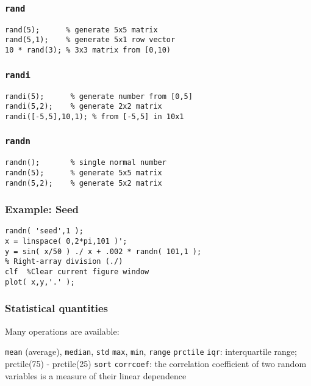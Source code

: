\documentclass[11pt]{beamer}
\begin{document}
\begin{frame}[fragile]
  \frametitle{\texttt{rand}}
  \Enlarge

  \begin{Verbatim}
rand(5);      % generate 5x5 matrix
rand(5,1);    % generate 5x1 row vector
10 * rand(3); % 3x3 matrix from [0,10)
  \end{Verbatim}
\end{frame}

\begin{frame}[fragile]
  \frametitle{\texttt{randi}}
  \Enlarge

  \begin{Verbatim}
randi(5);      % generate number from [0,5]
randi(5,2);    % generate 2x2 matrix
randi([-5,5],10,1); % from [-5,5] in 10x1
  \end{Verbatim}
\end{frame}

\begin{frame}[fragile]
  \frametitle{\texttt{randn}}
  \Enlarge

  \begin{Verbatim}
randn();       % single normal number
randn(5);      % generate 5x5 matrix
randn(5,2);    % generate 5x2 matrix
  \end{Verbatim}
\end{frame}

\begin{frame}[fragile]
  \frametitle{Example:  Seed}

  \begin{Verbatim}
randn( 'seed',1 );
x = linspace( 0,2*pi,101 )';
y = sin( x/50 ) ./ x + .002 * randn( 101,1 );
% Right-array division (./)
clf  %Clear current figure window
plot( x,y,'.' );
  \end{Verbatim}
\end{frame}

\begin{frame}[fragile]
  \frametitle{Statistical quantities}
  \Enlarge

  \begin{enumerate}
  \myitem  Many operations are available:
    \begin{enumerate}
    \mysubitem  \texttt{mean} (average), \texttt{median}, \texttt{std}
    \mysubitem  \texttt{max}, \texttt{min}, \texttt{range}
    \mysubitem  \texttt{prctile} 
    \mysubitem  \texttt{iqr}: interquartile range; prctile(75) - prctile(25)
    \mysubitem  \texttt{sort}
    \mysubitem  \texttt{corrcoef}: the correlation coefficient of two random variables is a measure of their linear dependence
    \end{enumerate}
  \end{enumerate}
\end{frame}
\end{document}
